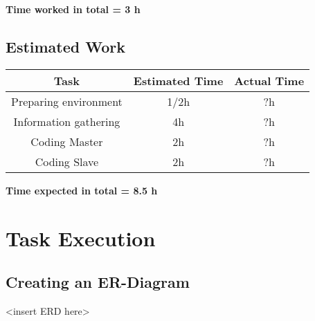 \documentclass[11pt,a4paper]{article}
\begin{document}
\bf Time worked in total = 3 h

\subsection{Estimated Work}

\begin{table}[h]
\begin{tabular}{@{}|c|c|c|@{}}
\toprule
\textbf{Task}         & \textbf{Estimated Time} & \textbf{Actual Time} \\ \midrule
Preparing environment & 1/2h                    & ?h                   \\ \midrule
Information gathering & 4h                      & ?h                   \\ \midrule
Coding Master         & 2h                      & ?h                   \\ \midrule
Coding Slave          & 2h                      & ?h                   \\ \bottomrule
\end{tabular}
\end{table}

\bf Time expected in total = 8.5 h

\newpage

\section{Task Execution}
\subsection{Creating an ER-Diagram}
<insert ERD here>
\end{document}
